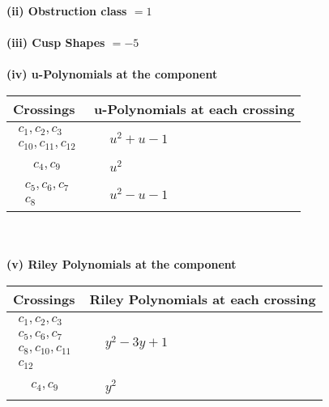 \documentclass[1p]{elsarticle_modified}
\theoremstyle{definition}
\begin{document}
\flushleft \textbf{(ii) Obstruction class $= 1$}\\~\\
\flushleft \textbf{(iii) Cusp Shapes $= -5$}\\~\\
\newpage\renewcommand{\arraystretch}{1}
\flushleft \textbf{(iv) u-Polynomials at the component}\newline \\
\begin{tabular}{m{50pt}|m{274pt}}
Crossings & \hspace{64pt}u-Polynomials at each crossing \\
\hline $$\begin{aligned}c_{1},c_{2},c_{3}\\c_{10},c_{11},c_{12}\end{aligned}$$&$\begin{aligned}
&u^2+u-1
\end{aligned}$\\
\hline $$\begin{aligned}c_{4},c_{9}\end{aligned}$$&$\begin{aligned}
&u^2
\end{aligned}$\\
\hline $$\begin{aligned}c_{5},c_{6},c_{7}\\c_{8}\end{aligned}$$&$\begin{aligned}
&u^2- u-1
\end{aligned}$\\
\hline
\end{tabular}\\~\\
\newpage\renewcommand{\arraystretch}{1}
\flushleft \textbf{(v) Riley Polynomials at the component}\newline \\
\begin{tabular}{m{50pt}|m{274pt}}
Crossings & \hspace{64pt}Riley Polynomials at each crossing \\
\hline $$\begin{aligned}c_{1},c_{2},c_{3}\\c_{5},c_{6},c_{7}\\c_{8},c_{10},c_{11}\\c_{12}\end{aligned}$$&$\begin{aligned}
&y^2-3 y+1
\end{aligned}$\\
\hline $$\begin{aligned}c_{4},c_{9}\end{aligned}$$&$\begin{aligned}
&y^2
\end{aligned}$\\
\hline
\end{tabular}\\~\\
\end{document}
